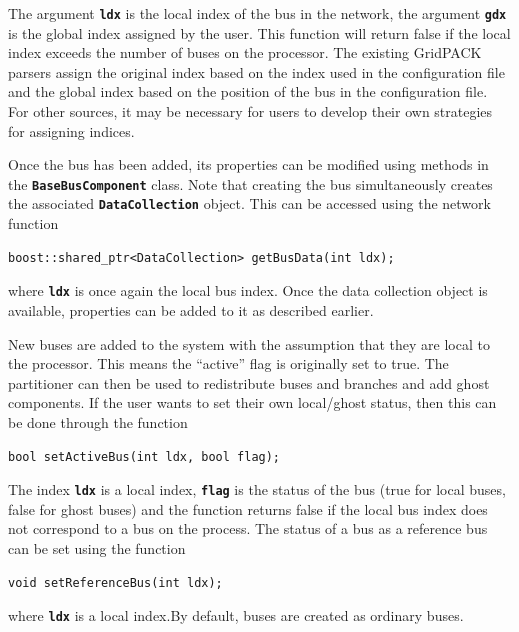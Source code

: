 The argument \texttt{\textbf{ldx}} is the local index of the bus in the network, the argument \texttt{\textbf{gdx}} is the global index assigned by the user. This function will return false if the local index exceeds the number of buses on the processor. The existing GridPACK parsers assign the original index based on the index used in the configuration file and the global index based on the position of the bus in the configuration file. For other sources, it may be necessary for users to develop their own strategies for assigning indices.

Once the bus has been added, its properties can be modified using methods in the \texttt{\textbf{BaseBusComponent}} class. Note that creating the bus simultaneously creates the associated \texttt{\textbf{DataCollection}} object. This can be accessed using the network function

{
\color{red}
\begin{Verbatim}[fontseries=b]
boost::shared_ptr<DataCollection> getBusData(int ldx);
\end{Verbatim}
}

where \texttt{\textbf{ldx}} is once again the local bus index. Once the data collection object is available, properties can be added to it as described earlier.

New buses are added to the system with the assumption that they are local to the processor. This means the ``active'' flag is originally set to true. The partitioner can then be used to redistribute buses and branches and add ghost components. If the user wants to set their own local/ghost status, then this can be done through the function

{
\color{red}
\begin{Verbatim}[fontseries=b]
bool setActiveBus(int ldx, bool flag);
\end{Verbatim}
}

The index \texttt{\textbf{ldx}} is a local index, \texttt{\textbf{flag}} is the status of the bus (true for local buses, false for ghost buses) and the function returns false if the local bus index does not correspond to a bus on the process.
The status of a bus as a reference bus can be set using the function

{
\color{red}
\begin{Verbatim}[fontseries=b]
void setReferenceBus(int ldx);
\end{Verbatim}
}

where \texttt{\textbf{ldx}} is a local index.By default, buses are created as ordinary buses.

